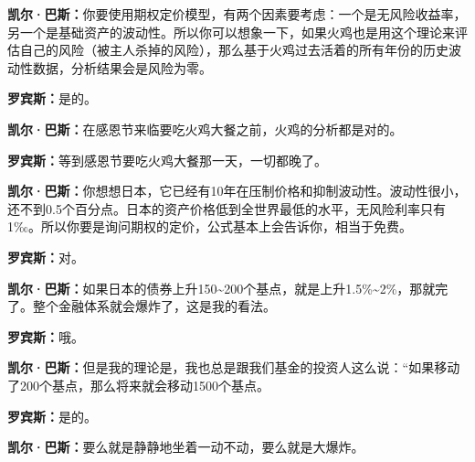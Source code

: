 \begin{BookQuote}
\textbf{凯尔·巴斯：}你要使用期权定价模型，有两个因素要考虑：一个是无风险收益率，另一个是基础资产的波动性。所以你可以想象一下，如果火鸡也是用这个理论来评估自己的风险（被主人杀掉的风险），那么基于火鸡过去活着的所有年份的历史波动性数据，分析结果会是风险为零。
\end{BookQuote}

\begin{BookQuote}
\textbf{罗宾斯：}是的。
\end{BookQuote}

\begin{BookQuote}
\textbf{凯尔·巴斯：}在感恩节来临要吃火鸡大餐之前，火鸡的分析都是对的。
\end{BookQuote}

\begin{BookQuote}
\textbf{罗宾斯：}等到感恩节要吃火鸡大餐那一天，一切都晚了。
\end{BookQuote}

\begin{BookQuote}
\textbf{凯尔·巴斯：}你想想日本，它已经有10年在压制价格和抑制波动性。波动性很小，还不到0.5个百分点。日本的资产价格低到全世界最低的水平，无风险利率只有1‰。所以你要是询问期权的定价，公式基本上会告诉你，相当于免费。
\end{BookQuote}

\begin{BookQuote}
\textbf{罗宾斯：}对。
\end{BookQuote}

\begin{BookQuote}
\textbf{凯尔·巴斯：}如果日本的债券上升150\textasciitilde{}200个基点，就是上升1.5\%\textasciitilde{}2\%，那就完了。整个金融体系就会爆炸了，这是我的看法。
\end{BookQuote}

\begin{BookQuote}
\textbf{罗宾斯：}哦。
\end{BookQuote}

\begin{BookQuote}
\textbf{凯尔·巴斯：}但是我的理论是，我也总是跟我们基金的投资人这么说：“如果移动了200个基点，那么将来就会移动1500个基点。
\end{BookQuote}

\begin{BookQuote}
\textbf{罗宾斯：}是的。
\end{BookQuote}

\begin{BookQuote}
\textbf{凯尔·巴斯：}要么就是静静地坐着一动不动，要么就是大爆炸。
\end{BookQuote}

